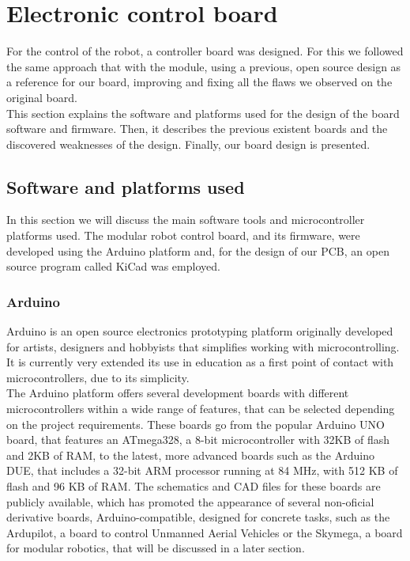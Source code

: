 \newpage 

\section{Electronic control board}
\label{hardware_electronics}

For the control of the robot, a controller board was designed. For this we followed the same approach that with the module, using a previous, open source design as a reference for our board, improving and fixing all the flaws we observed on the original board.\\

This section explains the software and platforms used for the design of the board software and firmware. Then, it describes the previous existent boards and the discovered weaknesses of the design. Finally, our board design is presented.


\subsection{Software and platforms used}
\label{hardware_electronic_tools}

In this section we will discuss the main software tools and microcontroller platforms used. The modular robot control board, and its firmware, were developed using the Arduino platform and, for the design of our PCB, an open source program called KiCad was employed.

\subsubsection{Arduino}

Arduino \cite{arduino} is an open source electronics prototyping platform originally developed for artists, designers and hobbyists that simplifies working with microcontrolling. It is currently very extended its use in education as a first point of contact with microcontrollers, due to its simplicity.\\

The Arduino platform offers several development boards with different microcontrollers within a wide range of features, that can be selected depending on the project requirements. These boards go from the popular Arduino UNO board, that features an ATmega328, a 8-bit microcontroller with 32KB of flash and 2KB of RAM, to the latest, more advanced boards such as the Arduino DUE, that includes a 32-bit ARM processor running at 84 MHz, with 512 KB of flash and 96 KB of RAM. The schematics and CAD files for these boards are publicly available, which has promoted the appearance of several non-oficial derivative boards, Arduino-compatible, designed for concrete tasks, such as the Ardupilot, a board to control Unmanned Aerial Vehicles or the Skymega, a board for modular robotics, that will be discussed in a later section.\\

